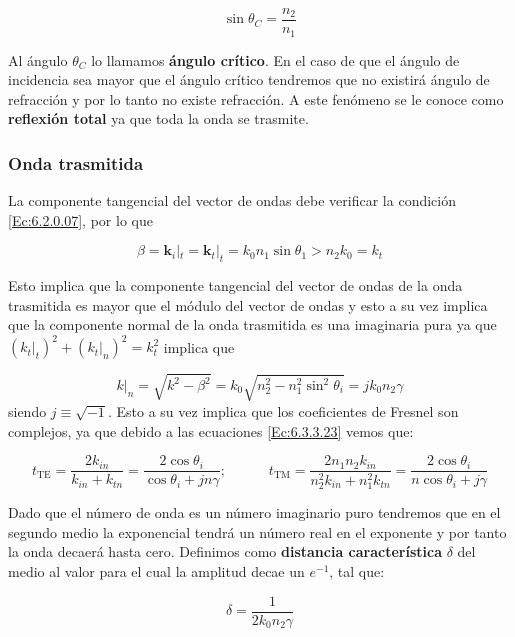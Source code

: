 \documentclass[12pt]{article}
\newcommand{\tquad}{\quad \quad \quad}
\newcommand{\TE}{\mathrm{TE}}
\newcommand{\TM}{\mathrm{TM}}
\newcommand{\kn}{\mathbf{k}}
\numberwithin{equation}{section}
\numberwithin{figure}{section}
\begin{document}
\begin{equation}
\sin \theta_C = \dfrac{n_2}{n_1}
\end{equation}

Al ángulo $\theta_C$ lo llamamos \textbf{ángulo crítico}. En el caso de que el ángulo de incidencia sea mayor que el ángulo crítico tendremos que no existirá ángulo de refracción y por lo tanto no existe refracción. A este fenómeno se le conoce como \textbf{reflexión total} ya que toda la onda se trasmite. 


\subsubsection{Onda trasmitida}

La componente tangencial del vector de ondas debe verificar la condición \ref{Ec:6.2.0.07}, por lo que

\begin{equation}
\beta = \kn_i |_t = \kn_t |_t = k_0 n_1 \sin \theta_1 > n_2 k_0 = k_t
\end{equation}

Esto implica que la componente tangencial del vector de ondas de la onda trasmitida es mayor que el módulo del vector de ondas y esto a su vez implica que la componente normal de la onda trasmitida es una imaginaria pura ya que
$(k_t |_t)^2 + (k_t |_n)^2 = k_t^2$ implica que

\begin{equation}
k |_n = \sqrt{k^2 - \beta^2} = k_0 \sqrt{n_2^2 - n_1^2 \sin^2 \theta_i} = j k_0 n_2 \gamma
\end{equation}
siendo $j \equiv \sqrt{-1}$. Esto a su vez implica que los coeficientes de Fresnel son complejos, ya que debido a las ecuaciones \ref{Ec:6.3.3.23} vemos que:

\begin{equation}
t_{\TE} = \dfrac{2 k_{in}}{k_{in}+k_{tn}} = \dfrac{2 \cos \theta_i}{\cos \theta_i + j n \gamma}; \tquad t_{\TM} = \dfrac{2 n_1 n_2 k_{in}}{n_2^2 k_{in}+n_1^2 k_{tn}} = \dfrac{2 \cos \theta_i}{n \cos \theta_i + j \gamma}
\end{equation}

Dado que el número de onda es un número imaginario puro tendremos que en el segundo medio la exponencial tendrá un número real en el exponente y por tanto la onda decaerá hasta cero. Definimos como \textbf{distancia característica} $\delta$ del medio al valor para el cual la amplitud decae un $e^{-1}$, tal que:

\begin{equation}
\delta = \dfrac{1}{2 k_0 n_2 \gamma}
\end{equation}
\end{document}
